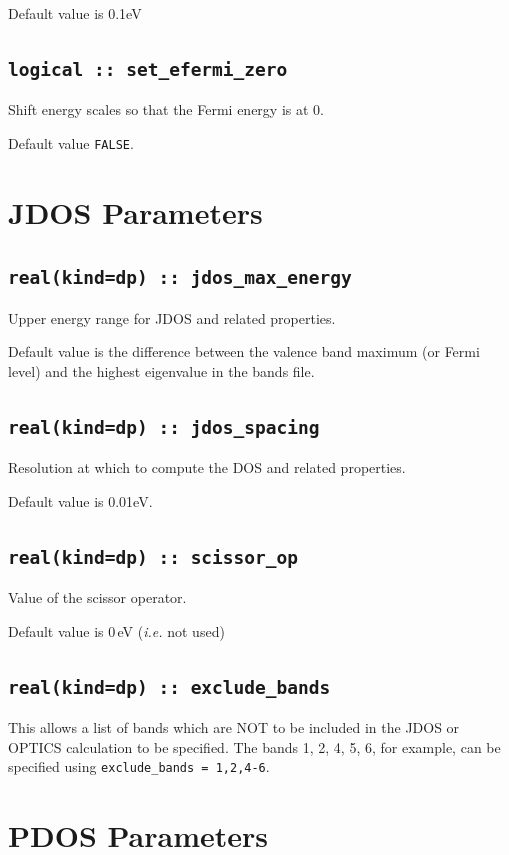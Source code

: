 \documentclass[a4paper,11pt,twoside]{book}
\begin{document}
{Default value is 0.1eV 

\subsection[set\_efermi\_zero]{\tt logical :: set\_efermi\_zero}
Shift energy scales so that the Fermi energy is at 0.

Default value \verb#FALSE#.



\section{JDOS Parameters}

\subsection[jdos\_max\_energy]{\tt real(kind=dp) :: jdos\_max\_energy}
Upper energy range for JDOS and related properties.

Default value is the difference between the valence band maximum (or
Fermi level) and the highest eigenvalue in the bands file.

\subsection[jdos\_spacing]{\tt real(kind=dp) :: jdos\_spacing} 
Resolution at which to compute the DOS and related properties.

Default value is 0.01eV. 

\subsection[scissor\_op]{\tt real(kind=dp) :: scissor\_op}
Value of the scissor operator. 

Default value is 0\,eV (\emph{i.e.} not used)

\subsection[exclude\_bands]{\tt real(kind=dp) :: exclude\_bands}
This allows a list of bands which are NOT to be included in the JDOS or OPTICS calculation to be specified.  The bands 1, 2, 4, 5, 6, for example, can be specified using \verb#exclude_bands = 1,2,4-6#. 

\section{PDOS Parameters}

}
\end{document}
